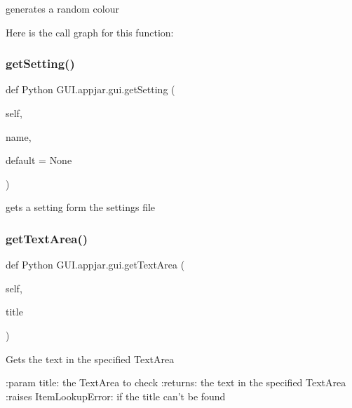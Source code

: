 \begin{DoxyVerb}generates a random colour \end{DoxyVerb}
 Here is the call graph for this function\+:
\mbox{\label{class_python_01_g_u_i_1_1appjar_1_1gui_a5777b9d316d378fe03f27668be389de1}} 
\subsubsection{\texorpdfstring{get\+Setting()}{getSetting()}}
{\footnotesize\ttfamily def Python G\+U\+I.\+appjar.\+gui.\+get\+Setting (\begin{DoxyParamCaption}\item[{}]{self,  }\item[{}]{name,  }\item[{}]{default = {\ttfamily None} }\end{DoxyParamCaption})}

\begin{DoxyVerb}gets a setting form the settings file \end{DoxyVerb}
 \mbox{\label{class_python_01_g_u_i_1_1appjar_1_1gui_afa588273483617b683ef7fd0a75b117f}} 
\subsubsection{\texorpdfstring{get\+Text\+Area()}{getTextArea()}}
{\footnotesize\ttfamily def Python G\+U\+I.\+appjar.\+gui.\+get\+Text\+Area (\begin{DoxyParamCaption}\item[{}]{self,  }\item[{}]{title }\end{DoxyParamCaption})}

\begin{DoxyVerb}Gets the text in the specified TextArea

:param title: the TextArea to check
:returns: the text in the specified TextArea
:raises ItemLookupError: if the title can't be found
\end{DoxyVerb}
 \mbox{\label{class_python_01_g_u_i_1_1appjar_1_1gui_ade30456e535cdeb47c70ca8bf595b8b7}} 
